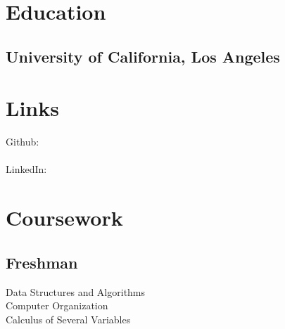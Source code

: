 \documentclass[]{deedy-resume-openfont}
\begin{document}
%
%



%
%

\begin{minipage}[t]{0.33\textwidth}


\section{Education}

\subsection{University of California, \newline Los Angeles}
\sectionsep


\section{Links}
Github:\\ \href{https://github.com/ashwin9798}{} \\
LinkedIn: \href{https://www.linkedin.com/ashwin-vivekanandh-554518126}{} \\
\sectionsep


\section{Coursework}
\subsection{Freshman}
Data Structures and Algorithms \\
Computer Organization \\
Calculus of Several Variables
\sectionsep


\end{minipage}
\end{document}
